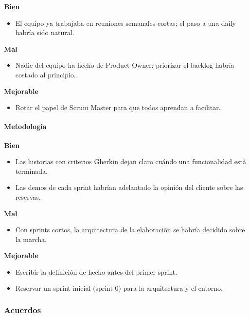 \textbf{Bien}

\begin{itemize}
\item El equipo ya trabajaba en reuniones semanales cortas; el paso a una daily habría sido natural.
\end{itemize}

\textbf{Mal}

\begin{itemize}
\item Nadie del equipo ha hecho de Product Owner; priorizar el backlog habría costado al principio.
\end{itemize}

\textbf{Mejorable}

\begin{itemize}
\item Rotar el papel de Scrum Master para que todos aprendan a facilitar.
\end{itemize}

\paragraph*{Metodología}

\textbf{Bien}

\begin{itemize}
\item Las historias con criterios Gherkin dejan claro cuándo una funcionalidad está terminada.
\item Las demos de cada sprint habrían adelantado la opinión del cliente sobre las reservas.
\end{itemize}

\textbf{Mal}

\begin{itemize}
\item Con sprints cortos, la arquitectura de la elaboración se habría decidido sobre la marcha.
\end{itemize}

\textbf{Mejorable}

\begin{itemize}
\item Escribir la definición de hecho antes del primer sprint.
\item Reservar un sprint inicial (sprint 0) para la arquitectura y el entorno.
\end{itemize}

\subsubsection*{Acuerdos}

